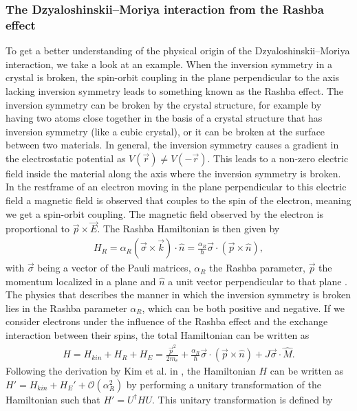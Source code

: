 \documentclass[12pt, a4paper]{article}		%
\DeclareRobustCommand{\orderof}{\ensuremath{\mathcal{O}}}
\numberwithin{equation}{section}
\begin{document}
\subsubsection{The Dzyaloshinskii--Moriya interaction from the Rashba effect}
To get a better understanding of the physical origin of the Dzyaloshinskii--Moriya interaction, we take a look at an example. When the inversion symmetry in a crystal is broken, the spin-orbit coupling in the plane perpendicular to the axis lacking inversion symmetry leads to something known as the Rashba effect. The inversion symmetry can be broken by the crystal structure, for example by having two atoms close together in the basis of a crystal structure that has inversion symmetry (like a cubic crystal), or it can be broken at the surface between two materials. In general, the inversion symmetry causes a gradient in the electrostatic potential as $V(\vec{r}) \neq V(-\vec{r})$. This leads to a non-zero electric field inside the material along the axis where the inversion symmetry is broken. In the restframe of an electron moving in the plane perpendicular to this electric field a magnetic field is observed that couples to the spin of the electron, meaning we get a spin-orbit coupling. The magnetic field observed by the electron is proportional to $\vec{p}\times\vec{E}$. The Rashba Hamiltonian is then given by
\begin{align}
\label{eq:RashbaH}
H_R = \alpha_R (\vec{\sigma} \times \vec{k})\cdot \hat{n} = \frac{\alpha_R}{\hbar} \vec{\sigma}\cdot(\vec{p}\times\hat{n}),
\end{align}
with $\vec{\sigma}$ being a vector of the Pauli matrices, $\alpha_R$ the Rashba parameter, $\vec{p}$ the momentum localized in a plane and $\hat{n}$ a unit vector perpendicular to that plane \cite{BychovRashba1984}. The physics that describes the manner in which the inversion symmetry is broken lies in the Rashba parameter $\alpha_R$, which can be both positive and negative. If we consider electrons under the influence of the Rashba effect and the exchange interaction between their spins, the total Hamiltonian can be written as
\begin{align}
\label{eq:RashbaModel}
H = H_{kin} + H_R + H_E = \frac{\vec{p}^2}{2m_e} + \frac{\alpha_R}{\hbar} \vec{\sigma}\cdot(\vec{p}\times\hat{n}) + J \vec{\sigma}\cdot\hat{M}.
\end{align}
Following the derivation by Kim et al. in \cite{DMIfromRashba_Kim}, the Hamiltonian $H$ can be written as $H'=H_{kin}+H_E'+\orderof(\alpha_R^2)$ by performing a unitary transformation of the Hamiltonian such that $H' = U^{\dagger}HU$. This unitary transformation is defined by
\end{document}
